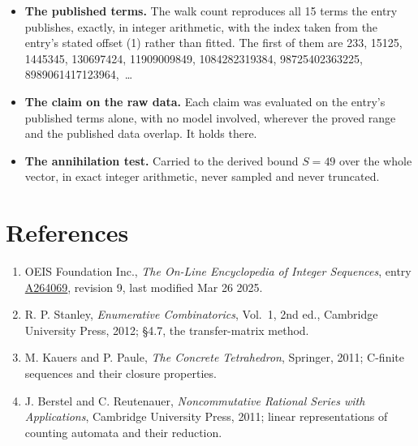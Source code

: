 \documentclass[11pt]{article}
\theoremstyle{definition}
\begin{document}
\begin{itemize}

\item {\bfseries The published terms.} The walk count reproduces all 15 terms the entry publishes, exactly, in integer arithmetic, with the index taken from the entry's stated offset (1) rather than fitted. The first of them are 233, 15125, 1445345, 130697424, 11909009849, 1084282319384, 98725402363225, 8989061417123964,~\dots

\item {\bfseries The claim on the raw data.} Each claim was evaluated on the entry's published terms alone, with no model involved, wherever the proved range and the published data overlap. It holds there.

\item {\bfseries The annihilation test.} Carried to the derived bound $S = 49$ over the whole vector, in exact integer arithmetic, never sampled and never truncated.

\end{itemize}

\section{References}

\begin{enumerate}

\item OEIS Foundation Inc., \emph{The On-Line Encyclopedia of Integer Sequences}, entry \href{https://oeis.org/A264069}{A264069}, revision 9, last modified Mar 26 2025.

\item R. P. Stanley, \emph{Enumerative Combinatorics}, Vol.~1, 2nd ed., Cambridge University Press, 2012; \S4.7, the transfer-matrix method.

\item M. Kauers and P. Paule, \emph{The Concrete Tetrahedron}, Springer, 2011; C-finite sequences and their closure properties.

\item J. Berstel and C. Reutenauer, \emph{Noncommutative Rational Series with Applications}, Cambridge University Press, 2011; linear representations of counting automata and their reduction.

\end{enumerate}
\end{document}
